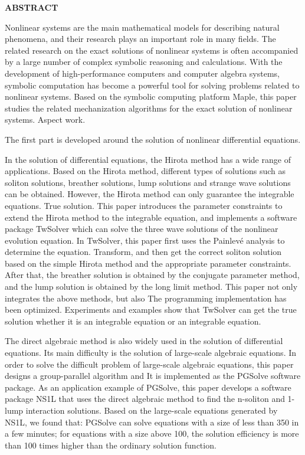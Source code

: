{}
\centerline{\bfseries ABSTRACT}

\linespread{1.4}
\bigskip
Nonlinear systems are the main mathematical models for describing natural phenomena, and their research plays an important role in many fields. The related research on the exact solutions of nonlinear systems is often accompanied by a large number of complex symbolic reasoning and calculations. With the development of high-performance computers and computer algebra systems, symbolic computation has become a powerful tool for solving problems related to nonlinear systems. Based on the symbolic computing platform Maple, this paper studies the related mechanization algorithms for the exact solution of nonlinear systems. Aspect work.

The first part is developed around the solution of nonlinear differential equations.

In the solution of differential equations, the Hirota method has a wide range of applications. Based on the Hirota method, different types of solutions such as soliton solutions, breather solutions, lump solutions and strange wave solutions can be obtained. However, the Hirota method can only guarantee the integrable equations. True solution. This paper introduces the parameter constraints to extend the Hirota method to the integrable equation, and implements a software package TwSolver which can solve the three wave solutions of the nonlinear evolution equation. In TwSolver, this paper first uses the Painlevé analysis to determine the equation. Transform, and then get the correct soliton solution based on the simple Hirota method and the appropriate parameter constraints. After that, the breather solution is obtained by the conjugate parameter method, and the lump solution is obtained by the long limit method. This paper not only integrates the above methods, but also The programming implementation has been optimized. Experiments and examples show that TwSolver can get the true solution whether it is an integrable equation or an integrable equation.

The direct algebraic method is also widely used in the solution of differential equations. Its main difficulty is the solution of large-scale algebraic equations. In order to solve the difficult problem of large-scale algebraic equations, this paper designs a group-parallel algorithm and It is implemented as the PGSolve software package. As an application example of PGSolve, this paper develops a software package NS1L that uses the direct algebraic method to find the n-soliton and 1-lump interaction solutions. Based on the large-scale equations generated by NS1L, we found that: PGSolve can solve equations with a size of less than 350 in a few minutes; for equations with a size above 100, the solution efficiency is more than 100 times higher than the ordinary solution function.

